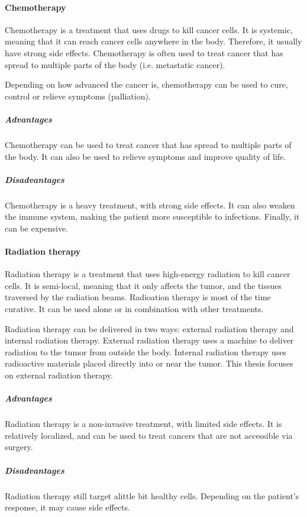 \paragraph{Chemotherapy}
Chemotherapy is a treatment that uses drugs to kill cancer cells.
It is systemic, meaning that it can reach cancer cells anywhere in the body.
Therefore, it usually have strong side effects.
Chemotherapy is often used to treat cancer that has spread to multiple parts of the body (i.e. metastatic cancer).

Depending on how advanced the cancer is, chemotherapy can be used to cure, control or relieve symptoms (palliation).

\subparagraph{Advantages}
Chemotherapy can be used to treat cancer that has spread to multiple parts of the body.
It can also be used to relieve symptoms and improve quality of life.

\subparagraph{Disadvantages}
Chemotherapy is a heavy treatment, with strong side effects.
It can also weaken the immune system, making the patient more susceptible to infections.
Finally, it can be expensive.

\paragraph{Radiation therapy}
Radiation therapy is a treatment that uses high-energy radiation to kill cancer cells.
It is semi-local, meaning that it only affects the tumor, and the tissues traversed by the radiation beams.
Radioation therapy is most of the time curative.
It can be used alone or in combination with other treatments.

Radiation therapy can be delivered in two ways: external radiation therapy and internal radiation therapy.
External radiation therapy uses a machine to deliver radiation to the tumor from outside the body.
Internal radiation therapy uses radioactive materials placed directly into or near the tumor.
This thesis focuses on external radiation therapy.

\subparagraph{Advantages}
Radiation therapy is a non-invasive treatment, with limited side effects.
It is relatively localized, and can be used to treat cancers that are not accessible via surgery.

\subparagraph{Disadvantages}
Radiation therapy still target alittle bit healthy cells.
Depending on the patient's response, it may cause side effects.

